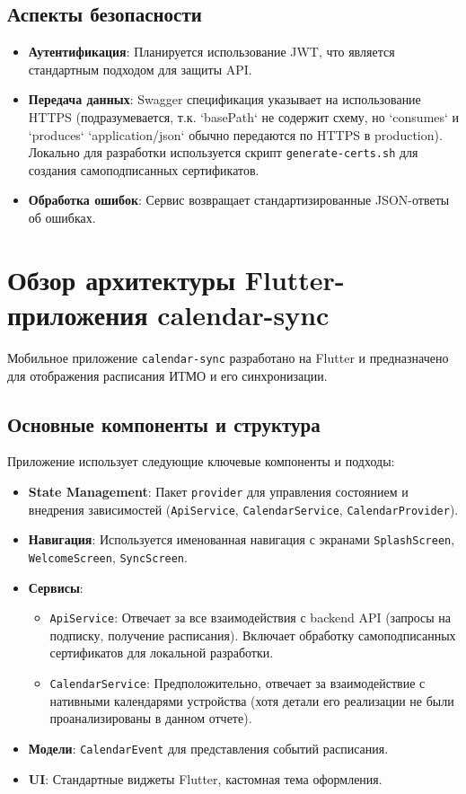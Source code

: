 \subsection{Аспекты безопасности}
\begin{itemize}
    \item \textbf{Аутентификация}: Планируется использование JWT, что является стандартным подходом для защиты API.
    \item \textbf{Передача данных}: Swagger спецификация указывает на использование HTTPS (подразумевается, т.к. `basePath` не содержит схему, но `consumes` и `produces` `application/json` обычно передаются по HTTPS в production). Локально для разработки используется скрипт \texttt{generate-certs.sh} для создания самоподписанных сертификатов.
    \item \textbf{Обработка ошибок}: Сервис возвращает стандартизированные JSON-ответы об ошибках.
\end{itemize}

\section{Обзор архитектуры Flutter-приложения calendar-sync}
Мобильное приложение \texttt{calendar-sync} разработано на Flutter и предназначено для отображения расписания ИТМО и его синхронизации.

\subsection{Основные компоненты и структура}
Приложение использует следующие ключевые компоненты и подходы:
\begin{itemize}
    \item \textbf{State Management}: Пакет \texttt{provider} для управления состоянием и внедрения зависимостей (\texttt{ApiService}, \texttt{CalendarService}, \texttt{CalendarProvider}).
    \item \textbf{Навигация}: Используется именованная навигация с экранами \texttt{SplashScreen}, \texttt{WelcomeScreen}, \texttt{SyncScreen}.
    \item \textbf{Сервисы}:
    \begin{itemize}
        \item \texttt{ApiService}: Отвечает за все взаимодействия с backend API (запросы на подписку, получение расписания). Включает обработку самоподписанных сертификатов для локальной разработки.
        \item \texttt{CalendarService}: Предположительно, отвечает за взаимодействие с нативными календарями устройства (хотя детали его реализации не были проанализированы в данном отчете).
    \end{itemize}
    \item \textbf{Модели}: \texttt{CalendarEvent} для представления событий расписания.
    \item \textbf{UI}: Стандартные виджеты Flutter, кастомная тема оформления.
\end{itemize}

